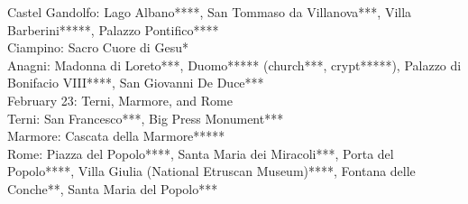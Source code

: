 Castel Gandolfo: Lago Albano****, San Tommaso da Villanova***, Villa Barberini*****, Palazzo Pontifico****\\%
Ciampino: Sacro Cuore di Gesu*\\%
Anagni: Madonna di Loreto***, Duomo***** (church***, crypt*****), Palazzo di Bonifacio VIII****, San Giovanni De Duce***\\%

February 23: Terni, Marmore, and Rome\\%

Terni: San Francesco***, Big Press Monument***\\%
Marmore: Cascata della Marmore*****\\%
Rome: Piazza del Popolo****, Santa Maria dei Miracoli***, Porta del Popolo****, Villa Giulia (National Etruscan Museum)****, Fontana delle Conche**, Santa Maria del Popolo***\\%

